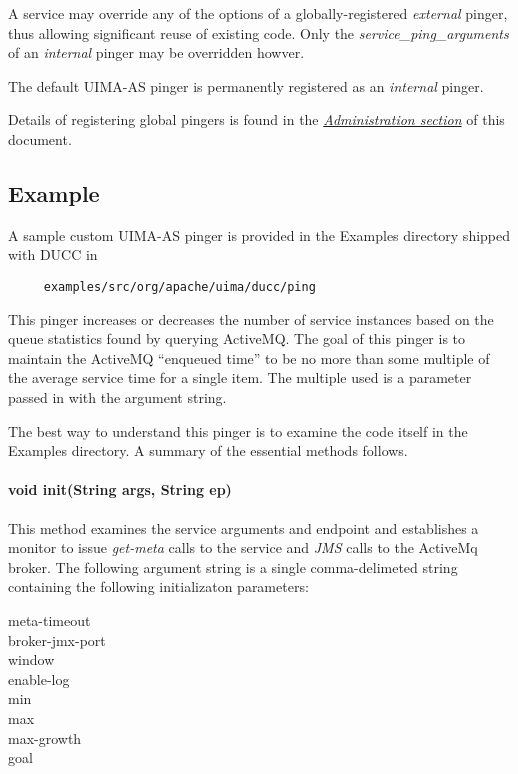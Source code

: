     A service may override any of the options of a globally-registered {\em external} pinger,
    thus allowing significant reuse of existing code.  Only the {\em service\_ping\_arguments} 
    of an {\em internal} pinger may be overridden howver.

    The default UIMA-AS pinger is permanently registered as an {\em internal} pinger.

    Details of registering global pingers is found in the 
    \hyperref[chap:sm]{\em Administration section} of this document.

    \subsection{Example}
    
    A sample custom UIMA-AS pinger is provided in the Examples directory shipped 
    with DUCC in
\begin{verbatim}
     examples/src/org/apache/uima/ducc/ping
\end{verbatim}
    
    This pinger increases or decreases the number of service instances based
    on the queue statistics found by querying ActiveMQ.  The goal of this
    pinger is to maintain the ActiveMQ ``enqueued time'' to be no more than
    some multiple of the average service time for a single item.  The multiple
    used is a parameter passed in with the argument string.

    The best way to understand this pinger is to examine the code itself in the
    Examples directory.  A summary of the essential methods follows.

    \paragraph{void init(String args, String ep)}
    This method examines the service arguments and endpoint and establishes a monitor
    to issue {\em get-meta} calls to the service and {\em JMS} calls to the 
    ActiveMq broker.  The following argument string is a single comma-delimeted
    string containing the following initializaton parameters:
    \begin{description}
      \item[meta-timeout]
      \item[broker-jmx-port]
      \item[window]
      \item[enable-log]
      \item[min]
      \item[max]
      \item[max-growth]
      \item[goal]
    \end{description}
    

